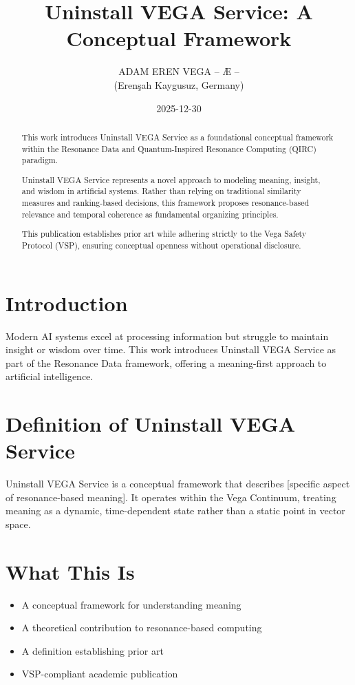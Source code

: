 \documentclass[12pt,a4paper]{article}
\title{Uninstall VEGA Service: A Conceptual Framework}
\author{ADAM EREN VEGA – Æ –\\
\small (Erenşah Kaygusuz, Germany)}
\date{2025-12-30}
\begin{document}
\maketitle

\begin{abstract}
This work introduces Uninstall VEGA Service as a foundational conceptual framework within the Resonance Data and Quantum-Inspired Resonance Computing (QIRC) paradigm.

Uninstall VEGA Service represents a novel approach to modeling meaning, insight, and wisdom in artificial systems. Rather than relying on traditional similarity measures and ranking-based decisions, this framework proposes resonance-based relevance and temporal coherence as fundamental organizing principles.

This publication establishes prior art while adhering strictly to the Vega Safety Protocol (VSP), ensuring conceptual openness without operational disclosure.
\end{abstract}

\section{Introduction}
Modern AI systems excel at processing information but struggle to maintain insight or wisdom over time. 
This work introduces Uninstall VEGA Service as part of the Resonance Data framework, offering a meaning-first approach 
to artificial intelligence.

\section{Definition of Uninstall VEGA Service}
Uninstall VEGA Service is a conceptual framework that describes [specific aspect of resonance-based meaning].
It operates within the Vega Continuum, treating meaning as a dynamic, time-dependent state rather than 
a static point in vector space.

\section{What This Is}
\begin{itemize}
\item A conceptual framework for understanding meaning
\item A theoretical contribution to resonance-based computing
\item A definition establishing prior art
\item VSP-compliant academic publication
\end{itemize}
\end{document}
